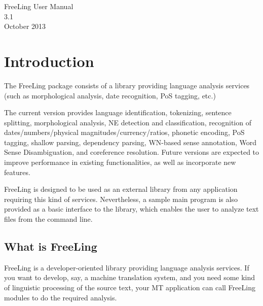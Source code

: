 \documentclass[a4paper]{book}
\begin{document}
\begin{titlepage}
\vspace*{7cm}
\begin{center}
{\Large FreeLing User Manual\\[1ex]\large 3.1}\\
\vspace*{1cm}
{\small October 2013}\\
\end{center}
\end{titlepage}

{\newpage{\pagestyle{empty}\cleardoublepage}}

\tableofcontents

{\newpage{\pagestyle{empty}\cleardoublepage}}


\chapter{Introduction}

The FreeLing package consists of a library providing language analysis
services (such as morphological analysis, date recognition, PoS
tagging, etc.)

The current version provides language identification, tokenizing,
sentence splitting, morphological analysis, NE detection and
classification, recognition of dates/numbers/physical
magnitudes/currency/ratios, phonetic encoding, PoS tagging, shallow
parsing, dependency parsing, WN-based sense annotation, Word Sense
Disambiguation, and coreference resolution.  Future versions are
expected to improve performance in existing functionalities, as well
as incorporate new features.

FreeLing is designed to be used as an external library from any
application requiring this kind of services. Nevertheless, a sample
main program is also provided as a basic interface to the library,
which enables the user to analyze text files from the command line.

\section{What is FreeLing}

FreeLing is a developer-oriented library providing language analysis services.
If you want to develop, say, a machine translation system, and you need some
kind of linguistic processing of the source text, your MT application can
call FreeLing modules to do the required analysis.
\end{document}
